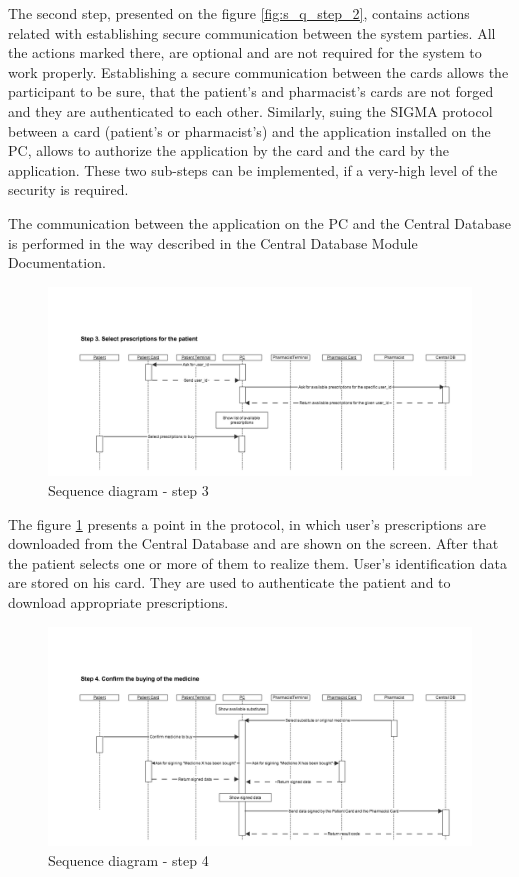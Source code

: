 The second step, presented on the figure \ref{fig:s_q_step_2}, contains actions related with establishing secure communication  between the system parties. All the actions marked there, are optional and are not required for the system to work properly. Establishing a secure communication between the cards allows the participant to be sure, that the patient's and pharmacist's cards are not forged and they are authenticated to each other.
Similarly, suing the SIGMA protocol between a card (patient's or pharmacist's) and the application installed on the PC, allows to authorize the application by the card and the card by the application. These two sub-steps can be implemented, if a very-high level of the security is required. 

The communication between the application on the PC and the Central Database is performed in the way described in the Central Database Module Documentation.

\begin{figure}	
	\hspace*{-1.5in}
    \includegraphics[scale=0.45]{s_d_3.png}
    \caption{Sequence diagram - step 3}
    \label{fig:s_q_step_3}
\end{figure} 

The figure \ref{fig:s_q_step_3} presents a point in the protocol, in which user's prescriptions are downloaded from the Central Database and are shown on the screen. After that the patient selects one or more of them to realize them.  User's identification data are stored on his card. They are used to authenticate the patient and to download appropriate prescriptions. 


\begin{figure}	
	\hspace*{-1.5in}
    \includegraphics[scale=0.45]{s_d_4.png}
    \caption{Sequence diagram - step 4}
    \label{fig:s_q_step_4}
\end{figure} 

